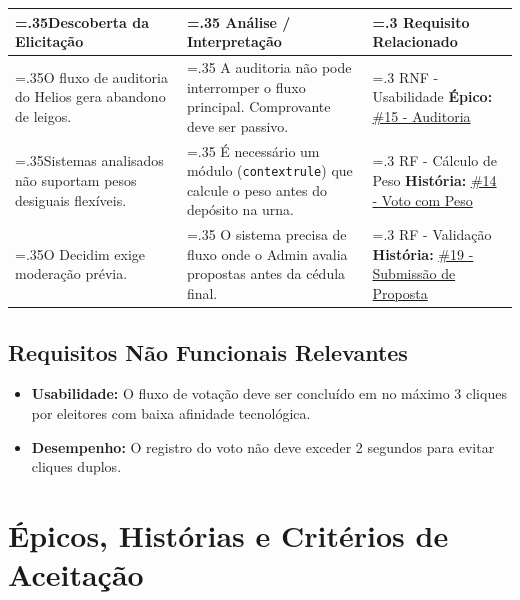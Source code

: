 \documentclass[12pt,a4paper]{article}
\begin{document}
\begin{table}[H]
\centering
\begin{tabularx}{\textwidth}{>{\hsize=.35\hsize}X >{\hsize=.35\hsize}X >{\hsize=.3\hsize}X}
\toprule
\textbf{Descoberta da Elicitação} & \textbf{Análise / Interpretação} & \textbf{Requisito Relacionado} \\
\midrule
O fluxo de auditoria do Helios gera abandono de leigos. & A auditoria não pode interromper o fluxo principal. Comprovante deve ser passivo. & RNF - Usabilidade \newline \textbf{Épico:} \href{https://github.com/gsscala/MC656/issues/15}{\#15 - Auditoria} \\
Sistemas analisados não suportam pesos desiguais flexíveis. & É necessário um módulo (\texttt{contextrule}) que calcule o peso antes do depósito na urna. & RF - Cálculo de Peso \newline \textbf{História:} \href{https://github.com/gsscala/MC656/issues/14}{\#14 - Voto com Peso} \\
O Decidim exige moderação prévia. & O sistema precisa de fluxo onde o Admin avalia propostas antes da cédula final. & RF - Validação \newline \textbf{História:} \href{https://github.com/gsscala/MC656/issues/19}{\#19 - Submissão de Proposta} \\
\bottomrule
\end{tabularx}
\end{table}

\subsection{Requisitos Não Funcionais Relevantes}
\begin{itemize}
    \item \textbf{Usabilidade:} O fluxo de votação deve ser concluído em no máximo 3 cliques por eleitores com baixa afinidade tecnológica.
    \item \textbf{Desempenho:} O registro do voto não deve exceder 2 segundos para evitar cliques duplos.
\end{itemize}

\section{Épicos, Histórias e Critérios de Aceitação}
\end{document}
